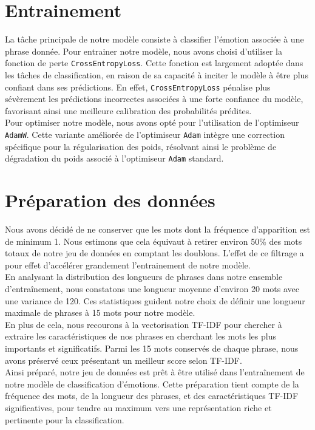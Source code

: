 \documentclass{article}
\begin{document}
\section{Entrainement}
La tâche principale de notre modèle consiste à classifier l'émotion associée à une phrase donnée. Pour entrainer notre modèle, nous avons choisi d'utiliser la fonction de perte \texttt{CrossEntropyLoss}. Cette fonction est largement adoptée dans les tâches de classification, en raison de sa capacité à inciter le modèle à être plus confiant dans ses prédictions. En effet, \texttt{CrossEntropyLoss} pénalise plus sévèrement les prédictions incorrectes associées à une forte confiance du modèle, favorisant ainsi une meilleure calibration des probabilités prédites. \\
Pour optimiser notre modèle, nous avons opté pour l'utilisation de l'optimiseur \texttt{AdamW}. Cette variante améliorée de l'optimiseur \texttt{Adam} intègre une correction spécifique pour la régularisation des poids, résolvant ainsi le problème de dégradation du poids associé à l'optimiseur \texttt{Adam} standard. 

\section{Préparation des données}
Nous avons décidé de ne conserver que les mots dont la fréquence d’apparition est de minimum 1. Nous estimons que cela équivaut à retirer environ 50\% des mots totaux de notre jeu de données en comptant les doublons. L’effet de ce filtrage a pour effet d’accélérer grandement l’entrainement de notre modèle. \\
En analysant la distribution des longueurs de phrases dans notre ensemble d'entraînement, nous constatons une longueur moyenne d'environ 20 mots avec une variance de 120. Ces statistiques guident notre choix de définir une longueur maximale de phrases à 15 mots pour notre modèle. \\
En plus de cela, nous recourons à la vectorisation TF-IDF pour chercher à extraire les caractéristiques de nos phrases en cherchant les mots les plus importants et significatifs. Parmi les 15 mots conservés de chaque phrase, nous avons préservé ceux présentant un meilleur score selon TF-IDF. \\
Ainsi préparé, notre jeu de données est prêt à être utilisé dans l'entraînement de notre modèle de classification d'émotions. Cette préparation tient compte de la fréquence des mots, de la longueur des phrases, et des caractéristiques TF-IDF significatives, pour tendre au maximum vers une représentation riche et pertinente pour la classification.
\end{document}
